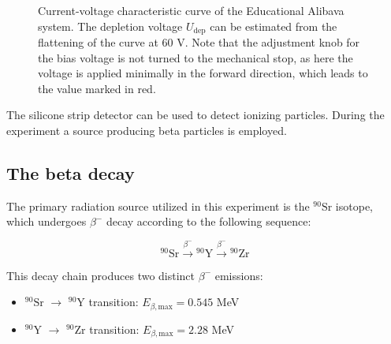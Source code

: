 \begin{figure}[H]
	\centering
	\caption{Current-voltage characteristic curve of the Educational Alibava system. The depletion voltage $U_{\mathrm{dep}}$ can be estimated from the flattening of the curve at 60 V. Note that the adjustment knob for the bias voltage is not turned to the mechanical stop, as here the voltage is applied minimally in the forward direction, which leads to the value marked in red.}
	\label{fig:currvolt}
\end{figure}

The silicone strip detector can be used to detect ionizing particles. During the experiment a source producing beta particles is employed.

\subsection{The beta decay}

The primary radiation source utilized in this experiment is the $^{90}\mathrm{Sr}$ isotope, which undergoes $\beta^{-}$ decay according to the following sequence:

\begin{equation}
    {^{90}\mathrm{Sr}} \xrightarrow{\beta^{-}} {^{90}\mathrm{Y}} \xrightarrow{\beta^{-}} {^{90}\mathrm{Zr}}
\end{equation}

This decay chain produces two distinct $\beta^{-}$ emissions:
\begin{itemize}
    \item $^{90}\mathrm{Sr}$ $\rightarrow$ $^{90}\mathrm{Y}$ transition: $E_{\beta,\text{max}} = 0.545$ MeV
    \item $^{90}\mathrm{Y}$ $\rightarrow$ $^{90}\mathrm{Zr}$ transition: $E_{\beta,\text{max}} = 2.28$ MeV
\end{itemize}

